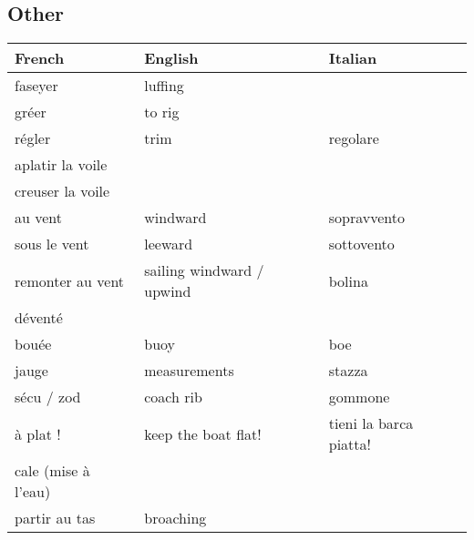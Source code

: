 \documentclass[a4paper, 12pt, twoside]{article}
\begin{document}
    \begin{indt}{\section{Other}} %
        \begin{tabular}{|l|l|l|}
            \hline %
            \textbf{French}
            & \textbf{English}
            & \textbf{Italian}
            \\
            \hline
            \hline %
            faseyer %
            & luffing
            &
            \\
            \hline %
            gréer %
            & to rig
            &
            \\
            \hline %
            régler %
            & trim
            & regolare
            \\
            \hline %
            aplatir la voile %
            &
            &
            \\
            \hline %
            creuser la voile %
            &
            &
            \\
            \hline %
            au vent %
            & windward
            & sopravvento
            \\
            \hline %
            sous le vent %
            & leeward
            & sottovento
            \\
            \hline %
            remonter au vent %
            & sailing windward / upwind
            & bolina
            \\
            \hline %
            déventé %
            &
            &
            \\
            \hline %
            bouée %
            & buoy
            & boe
            \\
            \hline %
            jauge %
            & measurements
            & stazza
            \\
            \hline %
            sécu / zod %
            & coach rib
            & gommone
            \\
            \hline %
            à plat ! %
            & keep the boat flat!
            & tieni la barca piatta!
            \\
            \hline %
            cale (mise à l'eau) %
            &
            &
            \\
            \hline %
            partir au tas %
            & broaching
            &
            \\
            \hline %
        \end{tabular}
    \end{indt} %
\end{document}
